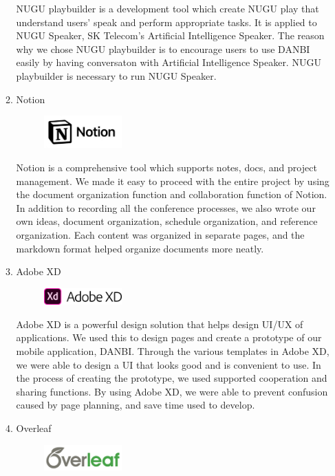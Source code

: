 \documentclass[conference]{IEEEtran}
\begin{document}
\begin{itemize}
\begin{enumerate}
NUGU playbuilder is a development tool which create NUGU play that understand users' speak and perform appropriate tasks. It is applied to NUGU Speaker, SK Telecom's Artificial Intelligence Speaker. The reason why we chose NUGU playbuilder is to encourage users to use DANBI easily by having conversaton with Artificial Intelligence Speaker. NUGU playbuilder is necessary to run NUGU Speaker.

\item Notion
\par \begin{figure}[h!]
\includegraphics[width=3cm]{image/Notion.JPG}
\centering
\end{figure}

Notion is a comprehensive tool which supports notes, docs, and project management. We made it easy to proceed with the entire project by using the document organization function and collaboration function of Notion. In addition to recording all the conference processes, we also wrote our own ideas, document organization, schedule organization, and reference organization. Each content was organized in separate pages, and the markdown format helped organize documents more neatly.

\item Adobe XD
\par \begin{figure}[h!]
\includegraphics[width=3cm]{image/Adobe XD.png}
\centering
\end{figure}

Adobe XD is a powerful design solution that helps design UI/UX of applications. We used this to design pages and create a prototype of our mobile application, DANBI. Through the various templates in Adobe XD, we were able to design a UI that looks good and is convenient to use. In the process of creating the prototype, we used supported cooperation and sharing functions. By using Adobe XD, we were able to prevent confusion caused by page planning, and save time used to develop.

\item Overleaf
\par \begin{figure}[h!]
\includegraphics[width=3cm]{image/Overleaf.png}
\centering
\end{figure}


\end{enumerate}
\end{itemize}
\end{document}
